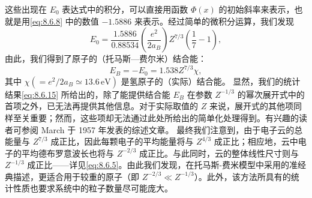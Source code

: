 这些出现在 \(E_{0}\) 表达式中的积分，可以直接用函数 \(\Phi(x)\) 的初始斜率来表示，也就是用\autoref{eq:8.6.8} 中的数值 \(-1.5886\) 来表示。经过简单的微积分运算，我们发现
\begin{equation}\tag{8.6.14}\label{eq:8.6.14}
E _ { 0 } = \frac { 1 . 58 86 } { 0 . 88 53 4 } \left( \frac { e ^{2} } { 2 a _ { B } } \right) Z ^{7 / 3} \left( \frac { 1 } { 7 } - 1 \right) ,
\end{equation}
由此，我们得到了原子的（托马斯---费尔米）结合能：
\begin{equation}\tag{8.6.15}\label{eq:8.6.15}
E _ { B } = - E _ { 0 } = 1 . 53 8 Z ^{7 / 3} \chi ,
\end{equation}
其中 \(\chi(=e^{2}/2a_{B}\simeq13.6\,\mathrm{eV})\) 是氢原子的（实际）结合能。
显然，我们的统计结果\autoref{eq:8.6.15} 所给出的，除了能提供结合能 \(E_{B}\) 在参数 \(Z^{-1/3}\) 的幂次展开式中的首项之外，已无法再提供其他信息。对于实际取值的 \(Z\) 来说，展开式的其他项同样至关重要；然而，这些项却无法通过此处所给出的简单化处理得到。有兴趣的读者可参阅 March 于 1957 年发表的综述文章。
最终我们注意到，由于电子云的总能量与 \(Z^{7/3}\) 成正比，因此每颗电子的平均能量将与 \(Z^{4/3}\) 成正比；相应地，云中电子的平均德布罗意波长也将与 \(Z^{-2/3}\) 成正比。与此同时，云的整体线性尺寸则与 \(Z^{-1/3}\) 成正比——详见\autoref{eq:8.6.5}。由此我们发现，在托马斯-费米模型中采用的准经典描述，更适合用于较重的原子（即 \(Z^{-2/3} \ll Z^{-1/3}\)）。此外，该方法所具有的统计性质也要求系统中的粒子数量尽可能庞大。
